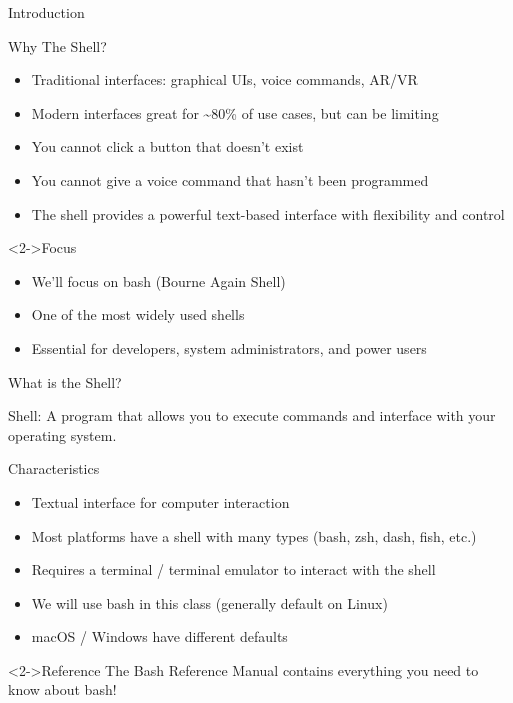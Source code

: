 \documentclass[presentation,aspectratio=1610]{beamer}
\begin{document}
\begin{frame}[label={sec:orgb8d8f7d}]{Introduction}
\begin{block}{Why The Shell?}
\begin{itemize}[<+->]
\item Traditional interfaces: graphical UIs, voice commands, AR/VR
\item Modern interfaces great for \textasciitilde{}80\% of use cases, but can be limiting
\item You cannot click a button that doesn't exist
\item You cannot give a voice command that hasn't been programmed
\item The shell provides a powerful \alert{text-based interface} with flexibility and control
\end{itemize}
\end{block}
\begin{exampleblock}<2->{Focus}\label{sec:orgcf01ddf}
\begin{itemize}
\item We'll focus on \alert{bash} (Bourne Again Shell)
\item One of the most widely used shells
\item Essential for developers, system administrators, and power users
\end{itemize}
\end{exampleblock}
\end{frame}
\begin{frame}[label={sec:org1126bdb}]{What is the Shell?}
\begin{definition}[Definition]\label{sec:orgb2e2f09}
\alert{Shell:} A program that allows you to execute commands and interface with your operating system.
\end{definition}
\begin{block}{Characteristics}
\begin{itemize}
\item Textual interface for computer interaction
\item Most platforms have a shell with many types (bash, zsh, dash, fish, etc.)
\item Requires a \alert{terminal} / \alert{terminal emulator} to interact with the shell
\item We will use \alert{bash} in this class (generally default on Linux)
\item macOS / Windows have different defaults
\end{itemize}
\end{block}
\begin{alertblock}<2->{Reference}
The \alert{Bash Reference Manual} contains everything you need to know about bash!
\end{alertblock}
\end{frame}
\end{document}

